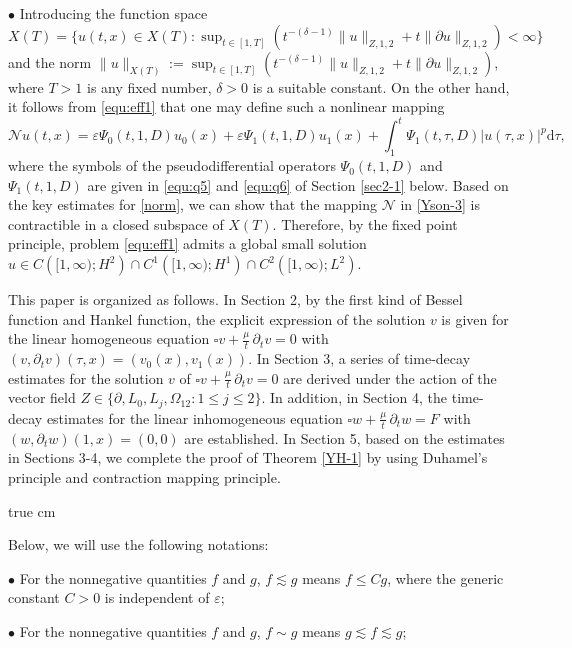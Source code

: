\documentclass[11pt,twoside]{article}
\newcommand{\p}{\partial}
\newcommand{\ve}{\varepsilon}
\newcommand{\f}{\frac}
\theoremstyle{plain}
\theoremstyle{definition}
\theoremstyle{remark}
\numberwithin{equation}{section}
\begin{document}
$\bullet$ Introducing the function space $X(T)=\{u(t,x)\in X(T): \sup _{t \in[1, T]}(t^{-(\delta-1)}\|u\|_{Z, 1, 2}
+t\|\p u\|_{Z, 1, 2})<\infty\}$
and the norm $\|u\|_{X(T)}:=\sup _{t \in[1, T]}(t^{-(\delta-1)}\|u\|_{Z, 1, 2}+t\|\p u\|_{Z, 1, 2})$,
where $T>1$ is any fixed number, $\delta>0$ is a suitable constant.
On the other hand, it follows from \eqref{equ:eff1} that one may define such a nonlinear mapping
\begin{equation}\label{Yson-3}
\mathcal{N} u(t, x)=\ve\Psi_{0}(t, 1, D)u_{0}(x)
+\ve\Psi_{1}(t, 1, D)u_{1}(x)+\int_{1}^{t} \Psi_{1}(t, \tau, D)|u(\tau, x)|^{p} \mathrm{d} \tau,
\end{equation}
where the symbols of the pseudodifferential operators $\Psi_{0}(t, 1, D)$ and $\Psi_{1}(t, 1, D)$
are given in \eqref{equ:q5} and \eqref{equ:q6} of Section \ref{sec2-1} below.
Based on the key estimates for \eqref{norm}, we can show that the mapping $\mathcal{N}$ in \eqref{Yson-3}
is contractible in a closed subspace of $X(T)$. Therefore, by the fixed point principle,
problem \eqref{equ:eff1} admits a global small solution $u\in C\left([1, \infty) ; H^{2}\right) \cap C^{1}\left([1, \infty) ; H^{1}\right)\cap C^{2}\left([1, \infty) ; L^{2}\right)$.


This paper is organized as follows. In Section 2, by the first kind of Bessel function and Hankel function,
the explicit expression of the solution $v$ is given for the linear homogeneous equation $\square v +\f{\mu}{t}\,\p_tv=0$
with $(v,\p_tv)(\tau,x)=(v_0(x), v_1(x))$.
In Section 3, a series of time-decay estimates for the solution $v$ of $\square v+\f{\mu}{t}\,\p_tv=0$
are derived under the action of the vector field $Z\in\{\p, L_0, L_j, \Omega_{12}:  1\le j\le 2\}$.
In addition, in Section 4, the time-decay estimates for the linear inhomogeneous
equation $\square w +\f{\mu}{t}\,\p_tw=F$ with $(w,\p_tw)(1,x)=(0, 0)$ are established.
In Section 5, based on the estimates in Sections 3-4,
we complete the  proof of Theorem  \ref{YH-1} by using Duhamel's principle and contraction mapping principle.

 true cm

Below, we will use the following notations:

$\bullet$  For the nonnegative quantities $f$ and $g$,
$f\lesssim g$ means $f \leq C g$, where the generic constant $C > 0$ is independent of $\ve$;

$\bullet$  For the nonnegative quantities $f$ and $g$, $f \sim g$ means $g\lesssim f \lesssim g$;
\end{document}
